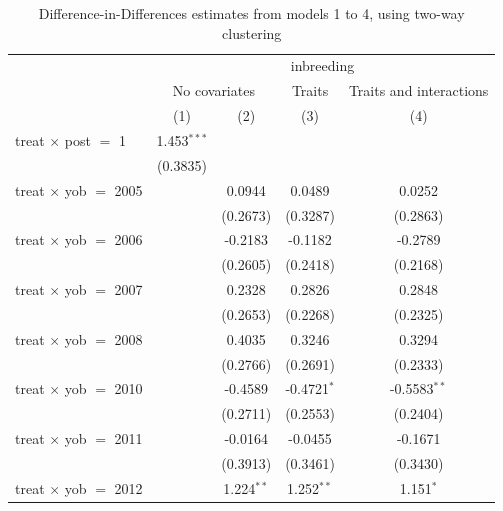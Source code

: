 
\begin{table}[htbp]
   \caption{\label{tab:table1c} Difference-in-Differences estimates from models 1 to 4, using two-way clustering}
   \bigskip
   \centering
   \begin{tabular}{lcccc}
      \toprule
       & \multicolumn{4}{c}{inbreeding}\\
       & \multicolumn{2}{c}{No covariates} & Traits & Traits and interactions \\ 
                                     & (1)           & (2)           & (3)           & (4)\\  
      \midrule 
      treat $\times$ post $=$ 1      & 1.453$^{***}$ &               &               &   \\   
                                     & (0.3835)      &               &               &   \\   
      treat $\times$ yob $=$ 2005    &               & 0.0944        & 0.0489        & 0.0252\\   
                                     &               & (0.2673)      & (0.3287)      & (0.2863)\\   
      treat $\times$ yob $=$ 2006    &               & -0.2183       & -0.1182       & -0.2789\\   
                                     &               & (0.2605)      & (0.2418)      & (0.2168)\\   
      treat $\times$ yob $=$ 2007    &               & 0.2328        & 0.2826        & 0.2848\\   
                                     &               & (0.2653)      & (0.2268)      & (0.2325)\\   
      treat $\times$ yob $=$ 2008    &               & 0.4035        & 0.3246        & 0.3294\\   
                                     &               & (0.2766)      & (0.2691)      & (0.2333)\\   
      treat $\times$ yob $=$ 2010    &               & -0.4589       & -0.4721$^{*}$ & -0.5583$^{**}$\\   
                                     &               & (0.2711)      & (0.2553)      & (0.2404)\\   
      treat $\times$ yob $=$ 2011    &               & -0.0164       & -0.0455       & -0.1671\\   
                                     &               & (0.3913)      & (0.3461)      & (0.3430)\\   
      treat $\times$ yob $=$ 2012    &               & 1.224$^{**}$  & 1.252$^{**}$  & 1.151$^{*}$\\   

\end{tabular}
\end{table}
